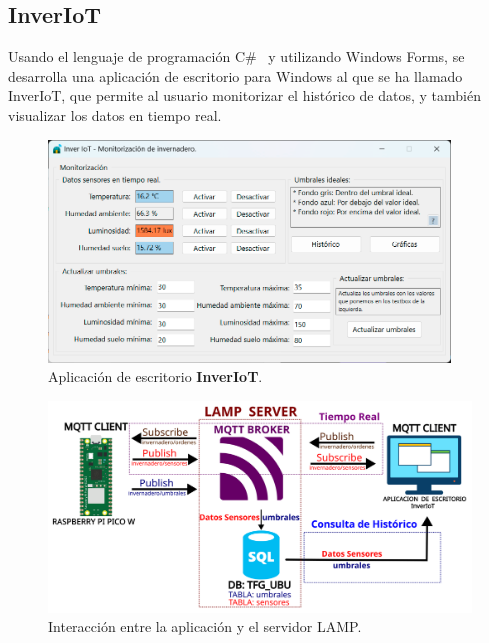 
\subsection{InverIoT}\label{proyecto:InverIoT}
Usando el lenguaje de programación C\#~\cite{manual:CSharp} y utilizando Windows Forms, se desarrolla una aplicación de escritorio para Windows al que se ha llamado InverIoT, que permite al usuario monitorizar el histórico de datos, y también visualizar los datos en tiempo real.

\begin{figure}[h]
    \centering
    \includegraphics[width=0.95\textwidth]{img/desarrollo/InverIoT_Desktop.png}
	\caption{Aplicación de escritorio \textbf{InverIoT}.}
\end{figure}

\begin{figure}[h]
    \centering
    \includegraphics[width=1\textwidth]{img/diagramas/mqtt_InverIoT.png}
    \caption{Interacción entre la aplicación y el servidor LAMP.}
\end{figure}

